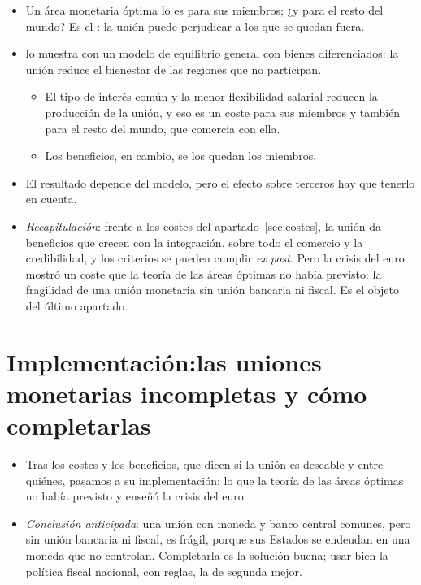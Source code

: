 \documentclass[11pt]{article}
\begin{document}
\begin{itemize}
\item Un área monetaria óptima lo es para sus miembros; ¿y para el resto del mundo? Es el : la unión puede perjudicar a los que se quedan fuera.
\item \textcite{Bayoumi1994Formal} lo muestra con un modelo de equilibrio general con bienes diferenciados: la unión reduce el bienestar de las regiones que no participan.
  \begin{itemize}
  \item El tipo de interés común y la menor flexibilidad salarial reducen la producción de la unión, y eso es un coste para sus miembros y también para el resto del mundo, que comercia con ella.
  \item Los beneficios, en cambio, se los quedan los miembros.
  \end{itemize}
\item El resultado depende del modelo, pero el efecto sobre terceros hay que tenerlo en cuenta.
\end{itemize}

\begin{itemize}
\item \emph{Recapitulación}: frente a los costes del apartado~\ref{sec:costes}, la unión da beneficios que crecen con la integración, sobre todo el comercio y la credibilidad, y los criterios se pueden cumplir \emph{ex post}. Pero la crisis del euro mostró un coste que la teoría de las áreas óptimas no había previsto: la fragilidad de una unión monetaria sin unión bancaria ni fiscal. Es el objeto del último apartado.
\end{itemize}

\section{Implementación:\cortetitulo las uniones monetarias incompletas y cómo completarlas}\label{sec:incompletas}

\begin{itemize}
\item Tras los costes y los beneficios, que dicen si la unión es deseable y entre quiénes, pasamos a su implementación: lo que la teoría de las áreas óptimas no había previsto y enseñó la crisis del euro.
\item \emph{Conclusión anticipada}: una unión con moneda y banco central comunes, pero sin unión bancaria ni fiscal, es frágil, porque sus Estados se endeudan en una moneda que no controlan. Completarla es la solución buena; usar bien la política fiscal nacional, con reglas, la de segunda mejor.
\end{itemize}
\end{document}
